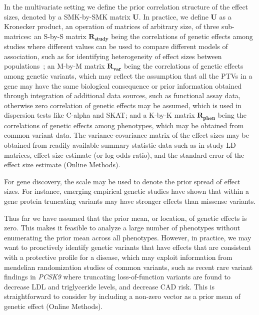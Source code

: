 In the multivariate setting we define the prior correlation structure of the effect sizes, denoted by a SMK-by-SMK matrix $\mathbf{U}$. In practice, we define $\mathbf{U}$ as a Kronecker product, an operation of matrices of arbitrary size, of three sub-matrices: an S-by-S matrix $\mathbf{R_{\textrm{study}}}$ being the correlations of genetic effects among studies where different values can be used to compare different models of association, such as for identifying heterogeneity of effect sizes between populations~\cite{band2013imputation}; an M-by-M matrix $\mathbf{R_{\textrm{var}}}$ being the correlations of genetic effects among genetic variants, which may reflect the assumption that all the PTVs in a gene may have the same biological consequence\cite{macarthur,rivas2013assessing,rivas2015effect} or prior information obtained through integration of additional data sources, such as functional assay data\cite{majithia2014rare,findlay2014saturation}, otherwise zero correlation of genetic effects may be assumed, which is used in dispersion tests like C-alpha\cite{calpha,clarke2013flexible} and SKAT\cite{skat}; and a K-by-K matrix $\mathbf{R_{\textrm{phen}}}$ being the correlations of genetic effects among phenotypes, which may be obtained from common variant data\cite{cotsapas2011pervasive,solovieff2013pleiotropy,gencorr2015}. The variance-covariance matrix of the effect sizes may be obtained from readily available summary statistic data such as in-study LD matrices, effect size estimate (or log odds ratio), and the standard error of the effect size estimate (Online Methods).

For gene discovery, the scale may be used to denote the prior spread of effect sizes. For instance, emerging empirical genetic studies have shown that within a gene protein truncating variants may have stronger effects than missense variants\cite{do2015exome}.

Thus far we have assumed that the prior mean, or location, of genetic effects is zero. This makes it feasible to analyze a large number of phenotypes without enumerating the prior mean across all phenotypes. However, in practice, we may want to proactively identify genetic variants that have effects that are consistent with a protective profile for a disease, which may exploit information from mendelian randomization studies of common variants, such as recent rare variant findings in {\it PCSK9} where truncating loss-of-function variants are found to decrease LDL and triglyceride levels, and decrease CAD risk\cite{cohen2005low,pcsk9,do2013common,cohorts2014loss}. This is straightforward to consider by including a non-zero vector as a prior mean of genetic effect (Online Methods).

